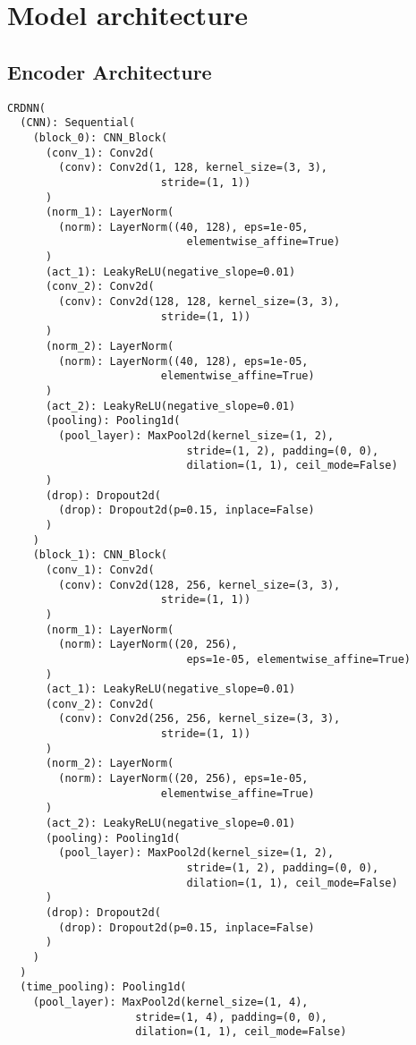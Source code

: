 \chapter{Model architecture}
\label{chapter:model-architecture}

\section*{Encoder Architecture}

\begin{verbatim}
CRDNN(
  (CNN): Sequential(
    (block_0): CNN_Block(
      (conv_1): Conv2d(
        (conv): Conv2d(1, 128, kernel_size=(3, 3), 
                        stride=(1, 1))
      )
      (norm_1): LayerNorm(
        (norm): LayerNorm((40, 128), eps=1e-05, 
                            elementwise_affine=True)
      )
      (act_1): LeakyReLU(negative_slope=0.01)
      (conv_2): Conv2d(
        (conv): Conv2d(128, 128, kernel_size=(3, 3), 
                        stride=(1, 1))
      )
      (norm_2): LayerNorm(
        (norm): LayerNorm((40, 128), eps=1e-05, 
                        elementwise_affine=True)
      )
      (act_2): LeakyReLU(negative_slope=0.01)
      (pooling): Pooling1d(
        (pool_layer): MaxPool2d(kernel_size=(1, 2), 
                            stride=(1, 2), padding=(0, 0), 
                            dilation=(1, 1), ceil_mode=False)
      )
      (drop): Dropout2d(
        (drop): Dropout2d(p=0.15, inplace=False)
      )
    )
    (block_1): CNN_Block(
      (conv_1): Conv2d(
        (conv): Conv2d(128, 256, kernel_size=(3, 3), 
                        stride=(1, 1))
      )
      (norm_1): LayerNorm(
        (norm): LayerNorm((20, 256), 
                            eps=1e-05, elementwise_affine=True)
      )
      (act_1): LeakyReLU(negative_slope=0.01)
      (conv_2): Conv2d(
        (conv): Conv2d(256, 256, kernel_size=(3, 3), 
                        stride=(1, 1))
      )
      (norm_2): LayerNorm(
        (norm): LayerNorm((20, 256), eps=1e-05, 
                        elementwise_affine=True)
      )
      (act_2): LeakyReLU(negative_slope=0.01)
      (pooling): Pooling1d(
        (pool_layer): MaxPool2d(kernel_size=(1, 2), 
                            stride=(1, 2), padding=(0, 0), 
                            dilation=(1, 1), ceil_mode=False)
      )
      (drop): Dropout2d(
        (drop): Dropout2d(p=0.15, inplace=False)
      )
    )
  )
  (time_pooling): Pooling1d(
    (pool_layer): MaxPool2d(kernel_size=(1, 4), 
                    stride=(1, 4), padding=(0, 0), 
                    dilation=(1, 1), ceil_mode=False)

\end{verbatim}
